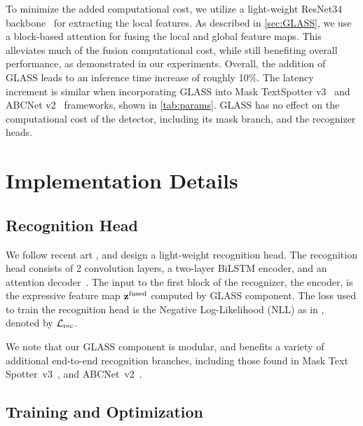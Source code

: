 \documentclass[runningheads]{llncs}
\begin{document}
To minimize the added computational cost, we utilize a light-weight ResNet34 backbone~\cite{focusing_att2017} for extracting the local features.
As described in \cref{sec:GLASS}, we use a block-based attention for fusing the local and global feature maps.
This alleviates much of the fusion computational cost, while still benefiting overall performance, as demonstrated in our experiments.
Overall, the addition of GLASS leads to an inference time increase of roughly 10\%.
The latency increment is similar when incorporating GLASS into Mask TextSpotter v3~\cite{liao2020spotterV3} and ABCNet v2~\cite{liu2021abcnetV2} frameworks, shown in \cref{tab:params}.
GLASS has no effect on the computational cost of the detector, including its mask branch, and the recognizer heads.






















\section{Implementation Details}
\label{sec:technical_details}


\subsection{Recognition Head}
\label{sec:recognition}
We follow recent art \cite{liu2021abcnetV2}, and design a light-weight recognition head.
The recognition head consists of 2 convolution layers, a two-layer BiLSTM encoder, and an attention decoder~\cite{clova}.
The input to the first block of the recognizer, the encoder, is the expressive feature map $\mathbf{z}^{\rm fused}$ computed by GLASS component.
The loss used to train the recognition head is the Negative Log-Likelihood (NLL) as in \cite{focusing_att2017}, denoted by $\mathcal{L}_{\rm rec}$.

We note that our GLASS component is modular, and benefits a variety of additional end-to-end recognition branches, including those found in Mask Text Spotter~v3~\cite{liao2020spotterV3}, and ABCNet~v2~\cite{liu2021abcnetV2}.


\subsection{Training and Optimization}
\end{document}
